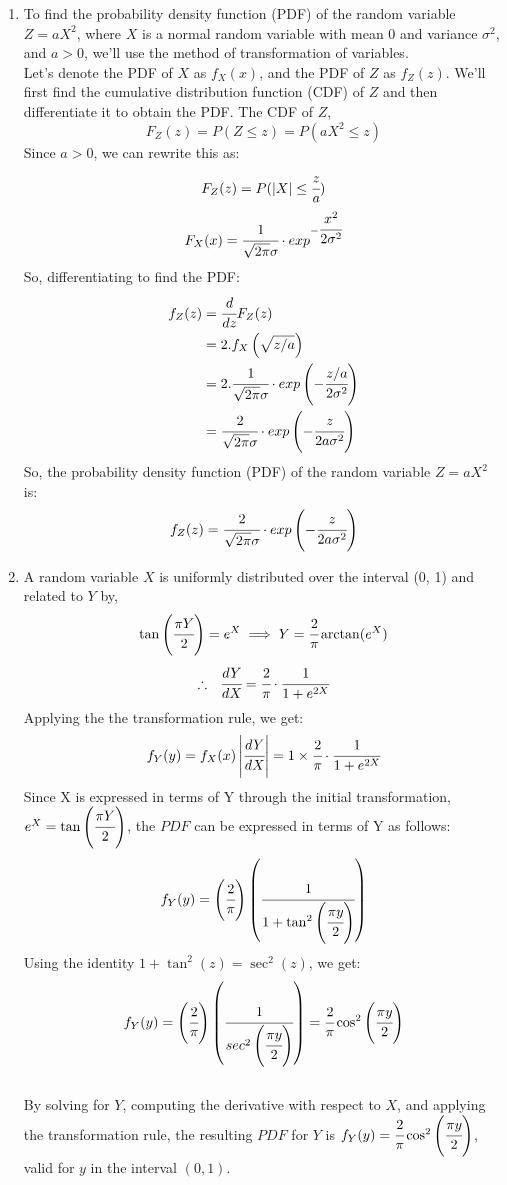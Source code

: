 \documentclass{article}
\begin{document}
\begin{enumerate}
\item 
    To find the probability density function (PDF) of the random variable $Z = aX^2$, where $X$ is a normal random variable with mean 0 and variance $\sigma^2$, and $a > 0$, we'll use the method of transformation of variables.\\
    Let's denote the PDF of $X$ as $f_X(x)$, and the PDF of $Z$ as $f_Z(z)$. We'll first find the cumulative distribution function (CDF) of $Z$ and then differentiate it to obtain the PDF.
        The CDF of $Z$,
        \[
            F_Z(z) = P(Z \leq z) = P(aX^2 \leq z)
        \]
        Since $a > 0$, we can rewrite this as:
        \[
            F_Z(z) = P(\left| X\right|\leq \cfrac{z}{a})
        \]
        \[
            F_X(x) = \cfrac{1}{\sqrt{2\pi }\sigma} \cdot exp^{-\cfrac{x^2}{2\sigma^2}}
        \]
        So,
        differentiating to find the PDF:
        \begin{align*}    
            f_Z(z) &= \cfrac{d}{dz}F_Z(z)\\
            &= 2.f_X\left(\sqrt{z/a}\right)\\
            &= 2.\cfrac{1}{\sqrt{2\pi }\sigma} \cdot exp \left(-\cfrac{z/a}{2\sigma^2}\right)\\
            &= \cfrac{2}{\sqrt{2\pi }\sigma} \cdot exp \left(-\cfrac{z}{2a\sigma^2}\right)\\
        \end{align*}
    So, the probability density function (PDF) of the random variable $Z = aX^2$ is:
    \[
        f_Z(z) = \cfrac{2}{\sqrt{2\pi }\sigma} \cdot exp \left(-\cfrac{z}{2a\sigma^2}\right)
    \]

\newpage
\item 
    A random variable \(X\) is uniformly distributed over the interval (0, 1) and related to \(Y\) by,
    \[
        \tan\left(\cfrac{\pi Y}{2}\right) = e^X \implies Y = \cfrac{2}{\pi}\arctan(e^X)
    \]
    \[
        \therefore\ \ \cfrac{dY}{dX} = \cfrac{2}{\pi}\cdot\cfrac{1}{1+e^{2X}}
    \]
    Applying the the transformation rule, we get:
    \[
        f_Y(y) = f_X(x)\left|\cfrac{dY}{dX}\right| = 1 \times \cfrac{2}{\pi}\cdot\cfrac{1}{1+e^{2X}}
    \]
    Since X is expressed in terms of Y through the initial transformation, $e^X = \tan\left(\cfrac{\pi Y}{2}\right)$, the \(PDF\) can be expressed in terms of Y as follows:
    \[
        f_Y(y) = \left(\cfrac{2}{\pi}\right)\left(\cfrac{1}{1+\tan^2\left(\cfrac{\pi y}{2}\right)}\right)
    \]
    Using the identity $1 + \tan^2(z) = \sec^2(z)$, we get:
    \[
        f_Y(y) = \left(\cfrac{2}{\pi}\right)\left(\cfrac{1}{sec^2\left(\cfrac{\pi y}{2}\right)}\right) = \cfrac{2}{\pi}\cos^2\left(\cfrac{\pi y}{2}\right)
    \]\\
    By solving for \(Y\), computing the derivative with respect to \(X\), and applying the transformation rule, the resulting \(PDF\) for \(Y\) is $f_Y(y) = \cfrac{2}{\pi}\cos^2\left(\cfrac{\pi y}{2}\right)$, valid for \(y\) in the interval $(0, 1)$.
    

\end{enumerate}
\end{document}
